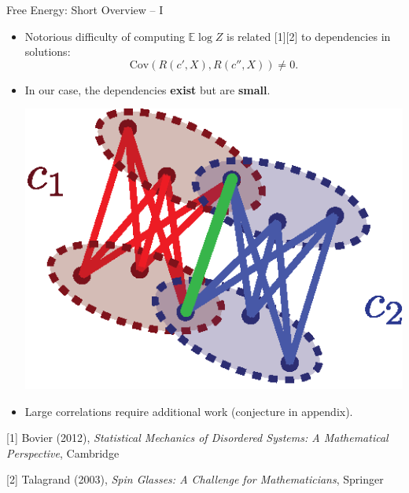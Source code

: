 \documentclass[presentation,12pt]{beamer}
\newcommand{\Expct}{\mathbb{E}}
\newcommand{\Cov}{\mathrm{Cov}}
\begin{document}
\begin{frame}{Free Energy: Short Overview -- I}

  \begin{itemize}
    \item Notorious difficulty of computing $\Expct \log Z$ is related [1][2]
      to dependencies in solutions: 
      \[\Cov(R(c', X), R(c'', X)) \ne 0.\]

    \item %
      \begin{minipage}[t]{0.5\linewidth}
        In our case, the dependencies \textbf{exist} but are \textbf{small}.
      \end{minipage}%
      \begin{minipage}[t]{0.5\linewidth}%
        \centering %
        \vspace{-4pt}\includegraphics[width=.7\textwidth]{different_solution_overlaps_3}
      \end{minipage}   
    
    \item Large correlations require additional work (conjecture in appendix). 
  \end{itemize}

  {
    \textcolor{gray!60}{
      \scriptsize [1] Bovier (2012), 
      \textit{Statistical Mechanics of Disordered Systems: A Mathematical Perspective}, Cambridge 
    }\par

    \textcolor{gray!60}{
      \scriptsize [2] Talagrand (2003), 
      \textit{Spin Glasses: A Challenge for Mathematicians}, Springer 
    }\par
  }
\end{frame}
\end{document}
